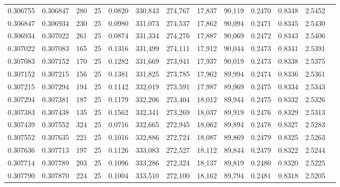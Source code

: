\begin{tabular}{rrrrrrrrrrrrr}
0.306755 & 0.306847 &   280 &  25 &                                     0.0820 & 330,843 & 274,767 &  17,837 &  90,119 & 0.2470 & 0.8348 & 2.5452 \\
0.306847 & 0.306934 &   230 &  25 &                                     0.0980 & 331,073 & 274,537 &  17,862 &  90,094 & 0.2471 & 0.8345 & 2.5430 \\
0.306934 & 0.307022 &   261 &  25 &                                     0.0874 & 331,334 & 274,276 &  17,887 &  90,069 & 0.2472 & 0.8343 & 2.5406 \\
0.307022 & 0.307083 &   165 &  25 &                                     0.1316 & 331,499 & 274,111 &  17,912 &  90,044 & 0.2473 & 0.8341 & 2.5391 \\
0.307083 & 0.307152 &   170 &  25 &                                     0.1282 & 331,669 & 273,941 &  17,937 &  90,019 & 0.2473 & 0.8338 & 2.5375 \\
0.307152 & 0.307215 &   156 &  25 &                                     0.1381 & 331,825 & 273,785 &  17,962 &  89,994 & 0.2474 & 0.8336 & 2.5361 \\
0.307215 & 0.307294 &   194 &  25 &                                     0.1142 & 332,019 & 273,591 &  17,987 &  89,969 & 0.2475 & 0.8334 & 2.5343 \\
0.307294 & 0.307381 &   187 &  25 &                                     0.1179 & 332,206 & 273,404 &  18,012 &  89,944 & 0.2475 & 0.8332 & 2.5326 \\
0.307383 & 0.307438 &   135 &  25 &                                     0.1562 & 332,341 & 273,269 &  18,037 &  89,919 & 0.2476 & 0.8329 & 2.5313 \\
0.307439 & 0.307552 &   324 &  25 &                                     0.0716 & 332,665 & 272,945 &  18,062 &  89,894 & 0.2478 & 0.8327 & 2.5283 \\
0.307552 & 0.307635 &   221 &  25 &                                     0.1016 & 332,886 & 272,724 &  18,087 &  89,869 & 0.2479 & 0.8325 & 2.5263 \\
0.307636 & 0.307713 &   197 &  25 &                                     0.1126 & 333,083 & 272,527 &  18,112 &  89,844 & 0.2479 & 0.8322 & 2.5244 \\
0.307714 & 0.307789 &   203 &  25 &                                     0.1096 & 333,286 & 272,324 &  18,137 &  89,819 & 0.2480 & 0.8320 & 2.5225 \\
0.307790 & 0.307870 &   224 &  25 &                                     0.1004 & 333,510 & 272,100 &  18,162 &  89,794 & 0.2481 & 0.8318 & 2.5205 \\

\end{tabular}
